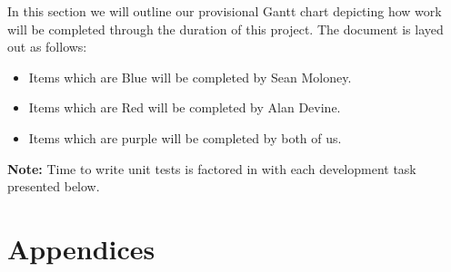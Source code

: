 \documentclass[12pt,a4paper,oneside]{book}
\theoremstyle{plain}
\numberwithin{equation}{chapter}
\begin{document}
\noindent In this section we will outline our provisional Gantt chart depicting how work will be completed through the duration of this project. The document is layed out as follows:

\begin{itemize}
    \item Items which are Blue will be completed by Sean Moloney.
    \item Items which are Red will be completed by Alan Devine.
    \item Items which are purple will be completed by both of us.
\end{itemize}

\noindent \textbf{Note:} Time to write unit tests is factored in with each development task presented below.



\chapter*{Appendices}
\end{document}
